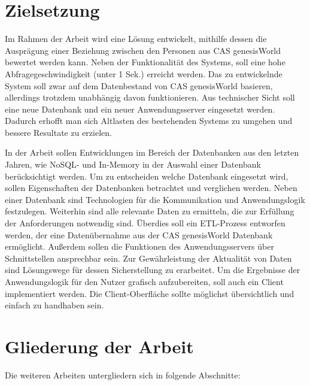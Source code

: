 \section{Zielsetzung}
\label{ch:Einfuehrung:sec:Zielsetzung}

Im Rahmen der Arbeit wird eine Lösung entwickelt, mithilfe dessen die Ausprägung einer Beziehung zwischen den Personen aus CAS genesisWorld bewertet werden kann. Neben der Funktionalität des Systems, soll eine hohe Abfragegeschwindigkeit (unter 1 Sek.) erreicht werden. Das zu entwickelnde System soll zwar auf dem Datenbestand von CAS genesisWorld basieren, allerdings trotzdem unabhängig davon funktionieren. Aus technischer Sicht soll eine neue Datenbank und ein neuer Anwendungsserver eingesetzt werden. Dadurch erhofft man sich Altlasten des bestehenden Systems zu umgehen und bessere Resultate zu erzielen. 

In der Arbeit sollen Entwicklungen im Bereich der Datenbanken aus den letzten Jahren, wie NoSQL- und In-Memory in der Auswahl einer Datenbank berücksichtigt werden. Um zu entscheiden welche Datenbank eingesetzt wird, sollen Eigenschaften der Datenbanken betrachtet und verglichen werden. Neben einer Datenbank sind Technologien für die Kommunikation und Anwendungslogik festzulegen. Weiterhin sind alle relevante Daten zu ermitteln, die zur Erfüllung der Anforderungen notwendig sind. Überdies soll ein ETL-Prozess entworfen werden, der eine Datenübernahme aus der CAS genesisWorld Datenbank ermöglicht. Außerdem sollen die Funktionen des Anwendungsservers über Schnittstellen ansprechbar sein. Zur Gewährleistung der Aktualität von Daten sind Lösungswege für dessen Sicherstellung zu erarbeitet. Um die Ergebnisse der Anwendungslogik für den Nutzer grafisch aufzubereiten, soll auch ein Client implementiert werden. Die Client-Oberfläche sollte möglichst übersichtlich und einfach zu handhaben sein.

\section{Gliederung der Arbeit}
\label{ch:Einfuehrung:sec:Gliederung}

Die weiteren Arbeiten untergliedern sich in folgende Abschnitte: 
 

